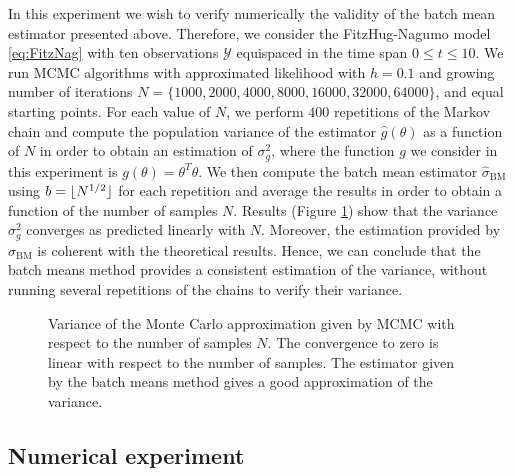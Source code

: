 In this experiment we wish to verify numerically the validity of the batch mean estimator presented above. Therefore, we consider the FitzHug-Nagumo model \eqref{eq:FitzNag} with ten observations $\mathcal{Y}$ equispaced in the time span $0 \leq t \leq 10$. We run MCMC algorithms with approximated likelihood with $h = 0.1$ and growing number of iterations $N = \{1000, 2000, 4000, 8000, 16000, 32000, 64000\}$, and equal starting points. For each value of $N$, we perform $400$ repetitions of the Markov chain and compute the population variance of the estimator $\hat g(\theta)$ as a function of $N$ in order to obtain an estimation of $\sigma^2_g$, where the function $g$ we consider in this experiment is $g(\theta) = \theta^T\theta$. We then compute the batch mean estimator $\hat \sigma_{\mathrm{BM}}$ using $b = \lfloor N^{1/2}\rfloor$ for each repetition and average the results in order to obtain a function of the number of samples $N$. Results (Figure \ref{fig:BatchMeans}) show that the variance $\sigma^2_g$ converges as predicted linearly with $N$. Moreover, the estimation provided by $\hat \sigma_{\mathrm{BM}}$ is coherent with the theoretical results. Hence, we can conclude that the batch means method provides a consistent estimation of the variance, without running several repetitions of the chains to verify their variance.

\begin{figure}
	\centering
	\resizebox{0.6\linewidth}{!}{}
	\caption{Variance of the Monte Carlo approximation given by MCMC with respect to the number of samples $N$. The convergence to zero is linear with respect to the number of samples. The estimator given by the batch means method gives a good approximation of the variance.}
	\label{fig:BatchMeans}
\end{figure}

\subsection{Numerical experiment}

